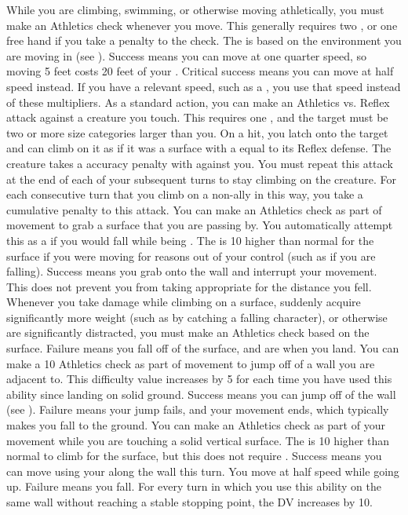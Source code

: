      While you are climbing, swimming, or otherwise moving athletically, you must make an Athletics check whenever you move.
    This generally requires two , or one free hand if you take a  penalty to the check.
    The  is based on the environment you are moving in (see ).
    Success means you can move at one quarter speed, so moving 5 feet costs 20 feet of your .
    Critical success means you can move at half speed instead.
    If you have a relevant speed, such as a , you use that speed instead of these multipliers.
     As a standard action, you can make an Athletics vs. Reflex attack against a creature you touch.
    This requires one , and the target must be two or more size categories larger than you.
    On a hit, you latch onto the target and can climb on it as if it was a surface with a  equal to its Reflex defense.
    The creature takes a  accuracy penalty with  against you.
    You must repeat this attack at the end of each of your subsequent turns to stay climbing on the creature.
    For each consecutive turn that you climb on a non-ally in this way, you take a cumulative  penalty to this attack.
     You can make an Athletics check as part of movement to grab a surface that you are passing by.
    You automatically attempt this as a  if you would fall while being .
    The  is 10 higher than normal for the surface if you were moving for reasons out of your control (such as if you are falling).
    Success means you grab onto the wall and interrupt your movement.
    This does not prevent you from taking  appropriate for the distance you fell.
     Whenever you take damage while climbing on a surface, suddenly acquire significantly more weight (such as by catching a falling character), or otherwise are significantly distracted, you must make an Athletics check based on the surface.
    Failure means you fall off of the surface, and are \prone when you land.
     You can make a  10 Athletics check as part of movement to jump off of a wall you are adjacent to.
    This difficulty value increases by 5 for each time you have used this ability since landing on solid ground.
    Success means you can jump off of the wall (see ).
    Failure means your jump fails, and your movement ends, which typically makes you fall to the ground.
     You can make an Athletics check as part of your movement while you are touching a solid vertical surface.
    The  is 10 higher than normal to climb for the surface, but this does not require .
    Success means you can move using your  along the wall this turn.
    You move at half speed while going up.
    Failure means you fall.
    For every turn in which you use this ability on the same wall without reaching a stable stopping point, the DV increases by 10.

